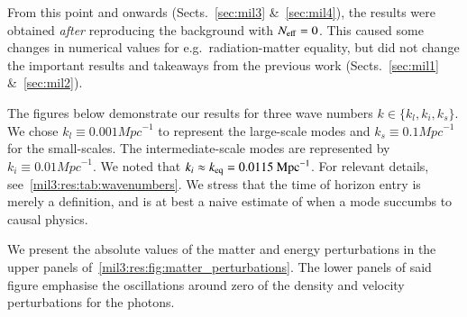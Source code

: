 


From this point and onwards (Sects.~\ref{sec:mil3} \&~\ref{sec:mil4}), the results were obtained \emph{after} reproducing the background with $N_\mathrm{eff}=0$. This caused some changes in numerical values for e.g.~radiation-matter equality, but did not change the important results and takeaways from the previous work (Sects.~\ref{sec:mil1} \&~\ref{sec:mil2}). 


The figures below demonstrate our results for three wave numbers $k\in\{k_l, k_i, k_s\}$. We chose $k_l\equiv0.001\unit{Mpc}^{-1}$ to represent the large-scale modes and $k_s\equiv0.1\unit{Mpc}^{-1}$ for the small-scales. The intermediate-scale modes are represented by $k_i\equiv0.01\unit{Mpc}^{-1}$. We noted that $k_i\approx k_\mathrm{eq}= 0.0115~\mathrm{Mpc}^{-1}$. For relevant details, see~\cref{mil3:res:tab:wavenumbers}. We stress that the time of horizon entry is merely a definition, and is at best a naive estimate of when a mode succumbs to causal physics.

We present the absolute values of the matter and energy perturbations in the upper panels of~\cref{mil3:res:fig:matter_perturbations}. The lower panels of said figure emphasise the oscillations around zero of the density and velocity perturbations for the photons.

